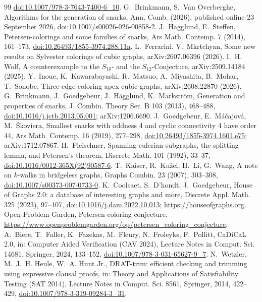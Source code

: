 \documentclass[11pt]{article}
\theoremstyle{definition}
\theoremstyle{remark}
\begin{document}
{\begin{thebibliography}{99}
\href{https://doi.org/10.1007/978-3-7643-7400-6_10}{doi:10.1007/978-3-7643-7400-6\_10}.
 G.~Brinkmann, S.~Van Overberghe, Algorithms for the generation of snarks, Ann. Comb. (2026),
published online 23 September 2026, \href{https://doi.org/10.1007/s00026-026-00858-2}{doi:10.1007/s00026-026-00858-2}.
 J.~H\"agglund, E.~Steffen, Petersen-colorings and some families of snarks,
Ars Math. Contemp. 7 (2014), 161--173,
\href{https://doi.org/10.26493/1855-3974.288.11a}{doi:10.26493/1855-3974.288.11a}.
 L.~Ferrarini, V.~Mkrtchyan, Some new results on Sylvester colorings of cubic graphs,
arXiv:2607.06396 (2026).
 I.~H. Wolf, A counterexample to the $S_{10}$- and the $S_{12}$-Conjecture,
arXiv:2509.14184 (2025).
 Y.~Inoue, K.~Kawarabayashi, R.~Matsuo, A.~Miyashita, B.~Mohar, T.~Sonobe, Three-edge-coloring apex
cubic graphs, arXiv:2608.22870 (2026).
 G.~Brinkmann, J.~Goedgebeur, J.~H\"agglund, K.~Markstr\"om, Generation and
properties of snarks, J. Combin. Theory Ser. B 103 (2013), 468--488,
\href{https://doi.org/10.1016/j.jctb.2013.05.001}{doi:10.1016/j.jctb.2013.05.001}; arXiv:1206.6690.
 J.~Goedgebeur, E.~M\'a\v{c}ajov\'a, M.~\v{S}koviera, Smallest snarks with oddness 4 and
cyclic connectivity 4 have order 44, Ars Math. Contemp. 16 (2019), 277--298,
\href{https://doi.org/10.26493/1855-3974.1601.e75}{doi:10.26493/1855-3974.1601.e75}; arXiv:1712.07867.
 H.~Fleischner, Spanning eulerian subgraphs, the splitting lemma, and
Petersen's theorem, Discrete Math. 101 (1992), 33--37,
\href{https://doi.org/10.1016/0012-365X(92)90587-6}{doi:10.1016/0012-365X(92)90587-6}.
 T.~Kaiser, R.~Ku\v{z}el, H.~Li, G.~Wang, A note on $k$-walks in bridgeless
graphs, Graphs Combin. 23 (2007), 303--308,
\href{https://doi.org/10.1007/s00373-007-0733-0}{doi:10.1007/s00373-007-0733-0}.
 K.~Coolsaet, S.~D'hondt, J.~Goedgebeur, House of Graphs 2.0: a database of
interesting graphs and more, Discrete Appl. Math. 325 (2023), 97--107,
\href{https://doi.org/10.1016/j.dam.2022.10.013}{doi:10.1016/j.dam.2022.10.013};
\url{https://houseofgraphs.org}.
 Open Problem Garden, Petersen coloring conjecture,
\url{https://www.openproblemgarden.org/op/petersen_coloring_conjecture}.
 A.~Biere, T.~Faller, K.~Fazekas, M.~Fleury, N.~Froleyks, F.~Pollitt, CaDiCaL 2.0,
in: Computer Aided Verification (CAV 2024), Lecture Notes in Comput. Sci. 14681, Springer, 2024,
133--152, \href{https://doi.org/10.1007/978-3-031-65627-9_7}{doi:10.1007/978-3-031-65627-9\_7}.
 N.~Wetzler, M.~J.~H. Heule, W.~A. Hunt Jr., DRAT-trim: efficient checking and
trimming using expressive clausal proofs, in: Theory and Applications of Satisfiability Testing
(SAT 2014), Lecture Notes in Comput. Sci. 8561, Springer, 2014, 422--429,
\href{https://doi.org/10.1007/978-3-319-09284-3_31}{doi:10.1007/978-3-319-09284-3\_31}.
\end{thebibliography}
}
\end{document}
